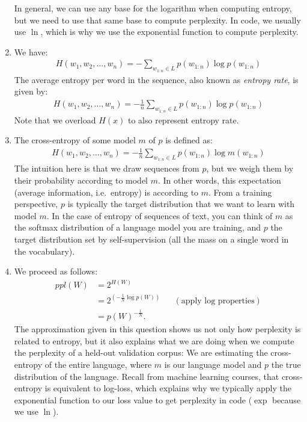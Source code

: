 \documentclass[11pt,a4paper]{article}
\begin{document}
\begin{enumerate}[label=(\alph*)]
          In general, we can use any base for the logarithm when computing
          entropy, but we need to use that same base to compute perplexity.
          In code, we usually use $\ln$, which is why we use the exponential
          function to compute perplexity.
    \item We have:
          \begin{align*}
              H(w_1,w_2,\ldots,w_n) = -\sum_{w_{1:n}\in L} p(w_{1:n})\log p(w_{1:n})
          \end{align*}
          The average entropy per word in the sequence, also known as
          \emph{entropy rate}, is given by:
          \begin{align*}
              H(w_1,w_2,\ldots,w_n) = -\frac{1}{n}\sum_{w_{1:n}\in L} p(w_{1:n})\log p(w_{1:n})
          \end{align*}
          Note that we overload $H(x)$ to also represent entropy rate.
    \item The cross-entropy of some model $m$ of $p$ is defined as:
          \begin{align*}
              H(w_1,w_2,\ldots,w_n) = -\frac{1}{n}\sum_{w_{1:n}\in L} p(w_{1:n})\log m(w_{1:n})
          \end{align*}
          The intuition here is that we draw sequences from $p$, but we weigh
          them by their probability according to model $m$.
          In other words, this expectation (average information, i.e.\ entropy)
          is according to $m$.
          From a training perspective, $p$ is typically the target distribution
          that we want to learn with model $m$.
          In the case of entropy of sequences of text, you can think of $m$
          as the softmax distribution of a language model you are training,
          and $p$ the target distribution set by self-supervision (all the
          mass on a single word in the vocabulary).
    \item We proceed as follows:
          \begin{align*}
              ppl(W) & = 2^{H(W)}                                                                   \\
                     & = 2^{\left(-\frac{1}{N} \log p(W)\right)} &  & (\text{apply log properties}) \\
                     & = p(W)^{-\frac{1}{N}}.
          \end{align*}
          The approximation given in this question shows us not only how
          perplexity is related to entropy, but it also explains what we are
          doing when we compute the perplexity of a held-out validation corpus:
          We are estimating the cross-entropy of the entire language, where $m$
          is our language model and $p$ the true distribution of the language.
          Recall from machine learning courses, that cross-entropy is equivalent
          to log-loss, which explains why we typically apply the exponential
          function to our loss value to get perplexity in code ($\exp$ because
          we use $\ln$).
\end{enumerate}
\end{document}
